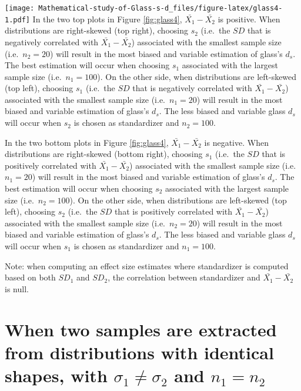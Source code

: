 \documentclass[
  man,floatsintext]{apa6}
\begin{document}
\texttt{[image: Mathematical-study-of-Glass-s-d\_files/figure-latex/glass4-1.pdf]}
In the two top plots in Figure \ref{fig:glass4}, \(\bar{X_1}-\bar{X_2}\) is positive. When distributions are right-skewed (top right), choosing \(s_2\) (i.e.~the \(SD\) that is negatively correlated with \(\bar{X_1}-\bar{X_2}\)) associated with the smallest sample size (i.e.~\(n_2=20\)) will result in the most biased and variable estimation of glass's \(d_s\). The best estimation will occur when choosing \(s_1\) associated with the largest sample size (i.e.~\(n_1=100\)). On the other side, when distributions are left-skewed (top left), choosing \(s_1\) (i.e.~the \(SD\) that is negatively correlated with \(\bar{X_1}-\bar{X_2}\)) associated with the smallest sample size (i.e.~\(n_1=20\)) will result in the most biased and variable estimation of glass's \(d_s\). The less biased and variable glass \(d_s\) will occur when \(s_2\) is chosen as standardizer and \(n_2=100\).

In the two bottom plots in Figure \ref{fig:glass4}, \(\bar{X_1}-\bar{X_2}\) is negative. When distributions are right-skewed (bottom right), choosing \(s_1\) (i.e.~the \(SD\) that is positively correlated with \(\bar{X_1}-\bar{X_2}\)) associated with the smallest sample size (i.e.~\(n_1=20\)) will result in the most biased and variable estimation of glass's \(d_s\). The best estimation will occur when choosing \(s_2\) associated with the largest sample size (i.e.~\(n_2=100\)). On the other side, when distributions are left-skewed (top left), choosing \(s_2\) (i.e.~the \(SD\) that is positively correlated with \(\bar{X_1}-\bar{X_2}\)) associated with the smallest sample size (i.e.~\(n_2=20\)) will result in the most biased and variable estimation of glass's \(d_s\). The less biased and variable glass \(d_s\) will occur when \(s_1\) is chosen as standardizer and \(n_1=100\).

Note: when computing an effect size estimates where standardizer is computed based on both \(SD_1\) and \(SD_2\), the correlation between standardizer and \(\bar{X_1}-\bar{X_2}\) is null.

\hypertarget{when-two-samples-are-extracted-from-distributions-with-identical-shapes-with-sigma_1-neq-sigma_2-and-n_1n_2}{%
\section{\texorpdfstring{When two samples are extracted from distributions with identical shapes, with \textbf{\(\sigma_1 \neq \sigma_2\)} and \textbf{\(n_1=n_2\)}}{When two samples are extracted from distributions with identical shapes, with \textbackslash sigma\_1 \textbackslash neq \textbackslash sigma\_2 and n\_1=n\_2}}\label{when-two-samples-are-extracted-from-distributions-with-identical-shapes-with-sigma_1-neq-sigma_2-and-n_1n_2}}
\end{document}
